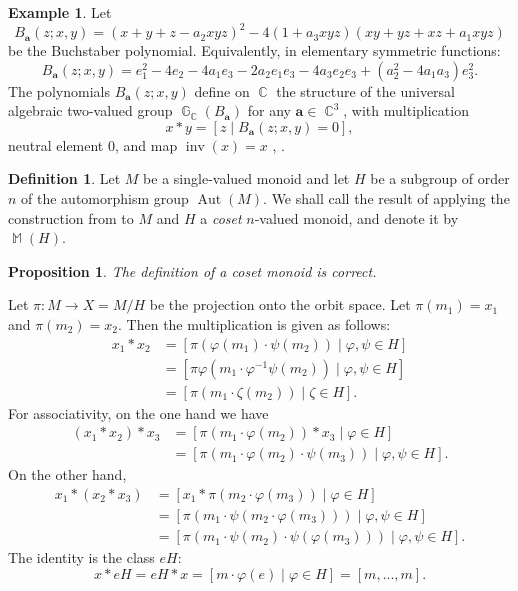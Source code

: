 \documentclass[14pt, dvipsnames]{extarticle}
\makeatletter
\theoremstyle{plain}
\newtheorem{prop}{Proposition}
\theoremstyle{definition}
\newtheorem{defi}{Definition}
\newtheorem{example}{\bf Example}
\theoremstyle{remark}
\renewenvironment{proof}[1][\proofname]{
  \par\pushQED{\qed}\normalfont
  \topsep6\p@\@plus6\p@\relax
  \trivlist\item[\hskip\labelsep\bfseries\itshape #1\@addpunct{.}]
}{\popQED\endtrivlist\@endpefalse}
\let\phi\varphi
\DeclareMathOperator{\G}{\mathbb{G}}
\DeclareMathOperator{\inv}{\mathrm{inv}}
\DeclareMathOperator{\Aut}{\mathrm{Aut}}
\DeclareMathOperator{\Cc}{\mathbb{C}}
\DeclareMathOperator{\M}{\mathbb{M}}
\makeatother
\begin{document}
\begin{example}\label{universal_2_valued}
Let
\begin{equation}\label{B_a}
B_{\boldsymbol{a}}(z; x, y) = (x + y + z - a_2xyz)^2 - 4(1 + a_3xyz)(xy + yz + xz + a_1xyz)
\end{equation}
be the Buchstaber polynomial. Equivalently, in elementary symmetric functions:
$$B_{\boldsymbol{a}}(z; x, y) = e_1^2 - 4 e_2 - 4 a_1 e_3 - 2 a_2 e_1 e_3 - 
 4 a_3 e_2 e_3 + (a_2^2 - 4 a_1 a_3) e_3^2.$$
The polynomials $B_{\boldsymbol{a}}(z; x, y)$ define on $\Cc$ the structure of the universal algebraic two-valued group $\G_{\Cc}(B_{\boldsymbol{a}})$ for any $\boldsymbol{a}\in\Cc^3$, with multiplication
$$x\ast y = [z\mid B_{\boldsymbol{a}}(z; x, y) = 0],$$
neutral element $0$, and map $\inv(x) = x$ \cite[Theorem 6.3]{Buchstaber_Veselov19}, \cite[Theorem 1]{BK}.
\end{example}

\begin{defi}
Let $M$ be a single-valued monoid and let $H$ be a subgroup of order $n$ of the automorphism group $\Aut(M)$. We shall call the result of applying the construction from \cite[Theorem 1]{Buchstaber} to $M$ and $H$ a {\it coset} $n$-valued monoid, and denote it by $\M(H)$. 
\end{defi}

\begin{prop}
The definition of a coset monoid is correct.
\end{prop}

\begin{proof}
Let $\pi: M\to X = M/H$ be the projection onto the orbit space. Let $\pi(m_1) = x_1$ and $\pi(m_2) = x_2$. Then the multiplication is given as follows:
$$\begin{aligned}
x_1\ast x_2 &= [\pi(\phi(m_1)\cdot \psi(m_2))\mid \phi, \psi\in H]\\
&= [\pi\phi(m_1\cdot \phi^{-1}\psi(m_2))\mid \phi, \psi\in H]\\
&= [\pi(m_1\cdot \zeta(m_2))\mid \zeta\in H].
\end{aligned}$$
For associativity, on the one hand we have
$$\begin{aligned}
(x_1\ast x_2)\ast x_3 &= [\pi(m_1\cdot \phi(m_2))\ast x_3 \mid \phi\in H]\\
&= [\pi(m_1\cdot \phi(m_2)\cdot \psi(m_3))\mid \phi, \psi \in H].
\end{aligned}$$
On the other hand,
$$\begin{aligned}
x_1\ast(x_2\ast x_3) &= [x_1\ast\pi(m_2\cdot \phi(m_3))\mid \phi\in H]\\
&= [\pi(m_1\cdot\psi(m_2\cdot\phi(m_3)))\mid \phi, \psi\in H]\\
&= [\pi(m_1\cdot \psi(m_2)\cdot \psi(\phi(m_3)))\mid \phi, \psi\in H].
\end{aligned}$$
The identity is the class $eH$:
$$x\ast eH = eH\ast x = [m\cdot \phi(e)\mid \phi\in H] = [m, ..., m].$$
\end{proof}
\end{document}
